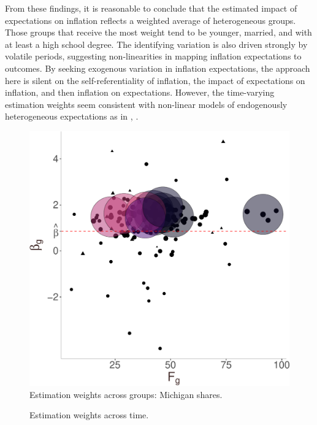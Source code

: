 \documentclass[12pt]{article}
\begin{document}
From these findings, it is reasonable to conclude that the estimated impact of expectations on inflation reflects a weighted average of heterogeneous groups. Those groups that receive the most weight tend to be younger, married, and with at least a high school degree. The identifying variation is also driven strongly by volatile periods, suggesting non-linearities in mapping inflation expectations to outcomes. By seeking exogenous variation in inflation expectations, the approach here is silent on the self-referentiality of inflation, the impact of expectations on inflation, and then inflation on expectations. However, the time-varying estimation weights seem consistent with non-linear models of endogenously heterogeneous expectations as in \cite{BranchEJ2004}, \cite{BrockHommesEconometrica1997}.




\begin{figure}
\centering
\caption{Estimation weights across groups: Michigan shares.}\label{fig:rotweights:group}
\includegraphics[height=.85\textwidth, width = .85\textwidth]{figs/weightsout}
\end{figure}

\begin{figure}
\centering
\caption{Estimation weights across time.}\label{fig:rotweights:time}

\end{figure}
\end{document}

